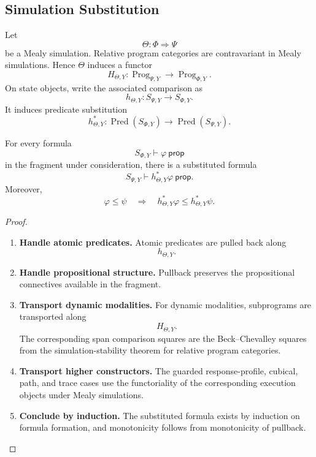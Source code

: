 \subsection{Simulation Substitution}
\label{subsec:simulation-substitution-formal}

Let
\[
  \Theta:\Phi\Rightarrow\Psi
\]
be a Mealy simulation.  Relative program categories are contravariant in
Mealy simulations.  Hence \(\Theta\) induces a functor
\[
  H_{\Theta,Y}:
  \operatorname{Prog}_{\Psi,Y}
  \longrightarrow
  \operatorname{Prog}_{\Phi,Y}.
\]
On state objects, write the associated comparison as
\[
  h_{\Theta,Y}:
  S_{\Psi,Y}\longrightarrow S_{\Phi,Y}.
\]
It induces predicate substitution
\[
  h_{\Theta,Y}^*:
  \operatorname{Pred}(S_{\Phi,Y})
  \longrightarrow
  \operatorname{Pred}(S_{\Psi,Y}).
\]

\begin{proposition}
\label{prop:simulation-substitution-logical}
For every formula
\[
  S_{\Phi,Y}\vdash\varphi\ \mathsf{prop}
\]
in the fragment under consideration, there is a substituted formula
\[
  S_{\Psi,Y}\vdash h_{\Theta,Y}^*\varphi\ \mathsf{prop}.
\]
Moreover,
\[
  \varphi\leq\psi
  \quad\Longrightarrow\quad
  h_{\Theta,Y}^*\varphi
  \leq
  h_{\Theta,Y}^*\psi.
\]
\end{proposition}

\begin{proof}
\leavevmode
\begin{enumerate}
  \item \textbf{Handle atomic predicates.}
  Atomic predicates are pulled back along
  \[
    h_{\Theta,Y}.
  \]

  \item \textbf{Handle propositional structure.}
  Pullback preserves the propositional connectives available in the fragment.

  \item \textbf{Transport dynamic modalities.}
  For dynamic modalities, subprograms are transported along
  \[
    H_{\Theta,Y}.
  \]
  The corresponding span comparison squares are the Beck--Chevalley squares
  from the simulation-stability theorem for relative program categories.

  \item \textbf{Transport higher constructors.}
  The guarded response-profile, cubical, path, and trace cases use the
  functoriality of the corresponding execution objects under Mealy
  simulations.

  \item \textbf{Conclude by induction.}
  The substituted formula exists by induction on formula formation, and
  monotonicity follows from monotonicity of pullback.
\end{enumerate}
\end{proof}

